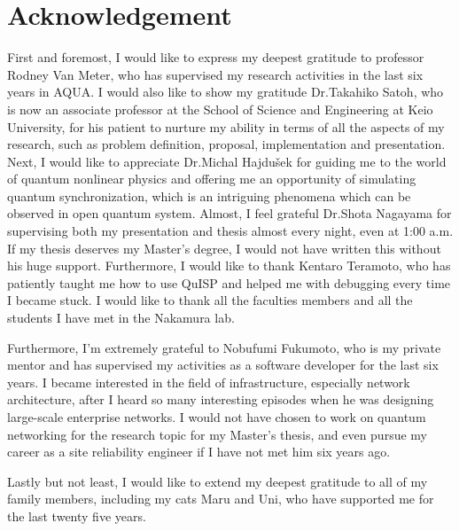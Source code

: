 \chapter*{Acknowledgement}
\label{acknowledgement}

First and foremost, I would like to express my deepest gratitude to professor Rodney Van Meter, who has supervised my research activities in the last six years in AQUA.
I would also like to show my gratitude Dr.Takahiko Satoh, who is now an associate professor at the School of Science and Engineering at Keio University, for his patient to nurture my ability in terms of all the aspects of my research, such as problem definition, proposal, implementation and presentation.
Next, I would like to appreciate Dr.Michal Hajdušek for guiding me to the world of quantum nonlinear physics and offering me an opportunity of simulating quantum synchronization, which is an intriguing phenomena which can be observed in open quantum system.
Almost, I feel grateful Dr.Shota Nagayama for supervising both my presentation and thesis almost every night, even at 1:00 a.m. If my thesis deserves my Master's degree, I would not have written this without his huge support.
Furthermore, I would like to thank Kentaro Teramoto, who has patiently taught me how to use QuISP and helped me with debugging every time I became stuck.
I would like to thank all the faculties members and all the students I have met in the Nakamura lab.

Furthermore, I'm extremely grateful to Nobufumi Fukumoto, who is my private mentor and has supervised my activities as a software developer for the last six years. I became interested in the field of infrastructure, especially network architecture, after I heard so many interesting episodes when he was designing large-scale enterprise networks.
I would not have chosen to work on quantum networking for the research topic for my Master's thesis, and even pursue my career as a site reliability engineer if I have not met him six years ago. 

Lastly but not least, I would like to extend my deepest gratitude to all of my family members, including my cats Maru and Uni, who have supported me for the last twenty five years.






